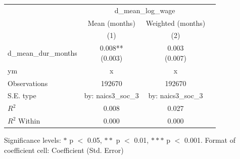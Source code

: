 \renewcommand\cellalign{t}
\begin{threeparttable}
\begin{tabular}{lccc}
\toprule
 & \multicolumn{2}{c}{d_mean_log_wage} \\
\cmidrule(lr){2-3} 
 & Mean (months) & Weighted (months) \\
 & (1) & (2) \\
\midrule
\addlinespace
d_mean_dur_months & \makecell{0.008** \\ (0.003)} & \makecell{0.003 \\ (0.007)} \\
\midrule
\addlinespace
ym & x & x \\
\midrule
\addlinespace
Observations & 192670 & 192670 \\
S.E. type & by: naics3_soc_3 & by: naics3_soc_3 \\
$R^2$ & 0.008 & 0.027 \\
$R^2$ Within & 0.000 & 0.000 \\
\bottomrule
\end{tabular}
\footnotesize Significance levels: $*$ p $<$ 0.05, $**$ p $<$ 0.01, $***$ p $<$ 0.001. Format of coefficient cell: Coefficient 
 (Std. Error)
\end{threeparttable}
